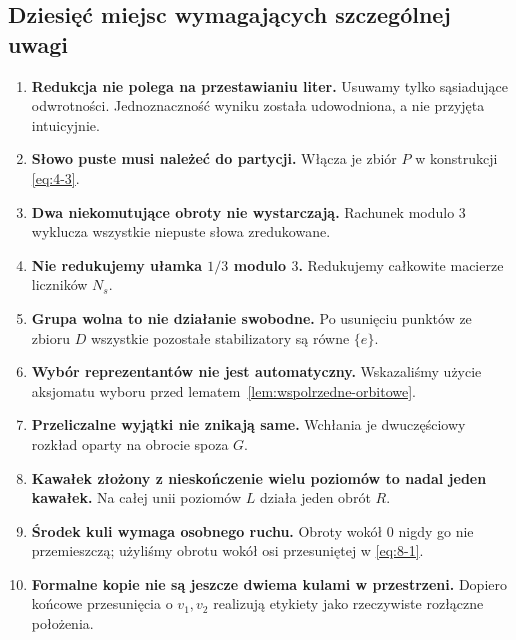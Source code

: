 \documentclass[11pt,a4paper]{article}
\numberwithin{equation}{section}
\theoremstyle{plain}
\theoremstyle{definition}
\theoremstyle{remark}
\begin{document}
\subsection{Dziesięć miejsc wymagających szczególnej uwagi}
\begin{enumerate}
\item \textbf{Redukcja nie polega na przestawianiu liter.} Usuwamy tylko sąsiadujące odwrotności. Jednoznaczność wyniku została udowodniona, a nie przyjęta intuicyjnie.
\item \textbf{Słowo puste musi należeć do partycji.} Włącza je zbiór $P$ w konstrukcji \eqref{eq:4-3}.
\item \textbf{Dwa niekomutujące obroty nie wystarczają.} Rachunek modulo $3$ wyklucza wszystkie niepuste słowa zredukowane.
\item \textbf{Nie redukujemy ułamka $1/3$ modulo $3$.} Redukujemy całkowite macierze liczników $N_s$.
\item \textbf{Grupa wolna to nie działanie swobodne.} Po usunięciu punktów ze zbioru $D$ wszystkie pozostałe stabilizatory są równe $\{e\}$.
\item \textbf{Wybór reprezentantów nie jest automatyczny.} Wskazaliśmy użycie aksjomatu wyboru przed lematem~\ref{lem:wspolrzedne-orbitowe}.
\item \textbf{Przeliczalne wyjątki nie znikają same.} Wchłania je dwuczęściowy rozkład oparty na obrocie spoza $G$.
\item \textbf{Kawałek złożony z nieskończenie wielu poziomów to nadal jeden kawałek.} Na całej unii poziomów $L$ działa jeden obrót $R$.
\item \textbf{Środek kuli wymaga osobnego ruchu.} Obroty wokół $0$ nigdy go nie przemieszczą; użyliśmy obrotu wokół osi przesuniętej w \eqref{eq:8-1}.
\item \textbf{Formalne kopie nie są jeszcze dwiema kulami w przestrzeni.} Dopiero końcowe przesunięcia o $v_1,v_2$ realizują etykiety jako rzeczywiste rozłączne położenia.
\end{enumerate}
\end{document}
